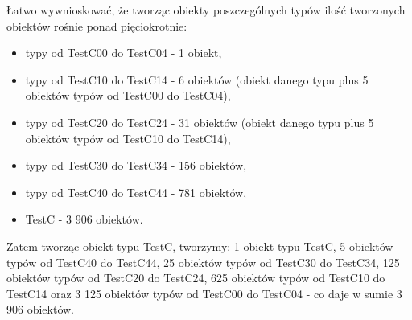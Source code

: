 \documentclass[12pt]{article}
\begin{document}
Łatwo wywnioskować, że tworząc obiekty poszczególnych typów ilość tworzonych obiektów rośnie ponad pięciokrotnie:
\begin{itemize}
	\item typy od TestC00 do TestC04 - 1 obiekt,
	\item typy od TestC10 do TestC14 - 6 obiektów (obiekt danego typu plus 5 obiektów typów od TestC00 do TestC04),
	\item typy od TestC20 do TestC24 - 31 obiektów (obiekt danego typu plus 5 obiektów typów od TestC10 do TestC14),
	\item typy od TestC30 do TestC34 - 156 obiektów,
	\item  typy od TestC40 do TestC44 - 781 obiektów,
	\item TestC - 3 906 obiektów.
\end{itemize}
Zatem tworząc obiekt typu TestC, tworzymy: 1 obiekt typu TestC, 5 obiektów typów od TestC40 do TestC44, 25 obiektów typów od TestC30 do TestC34, 125 obiektów typów od TestC20 do TestC24, 625 obiektów typów od TestC10 do TestC14 oraz 3 125 obiektów typów od TestC00 do TestC04 - co daje w sumie 3 906 obiektów.
\end{document}
